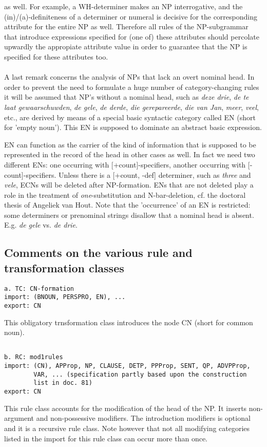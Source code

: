 as well. For example, a WH-determiner makes an NP interrogative, and the
(in)/(a)-definiteness of a determiner or numeral is decisive for the
corresponding attribute for the entire NP as well. Therefore all rules of the
NP-subgrammar that introduce expressions specified for (one of) these
attributes should percolate upwardly the appropiate attribute value in order to
guarantee that the NP is specified for these attributes too.\\ \\ 
A last remark concerns the analysis of NPs that lack an overt nominal head. In
order to prevent the need to formulate a huge number of category-changing rules
it will be assumed that NP's without a nominal head, such as 
{\em deze drie}, {\em de
te laat gewaarschuwden}, {\em de gele}, {\em de derde}, 
{\em die gerepareerde}, {\em die van
Jan}, {\em meer}, {\em veel}, etc., are derived by means of a special basic syntactic
category called EN (short for 'empty noun'). 
This EN is supposed to dominate an abstract
basic expression. 

EN can function as the carrier of the kind of information that is supposed to
be represented in the record of the head in other cases as well. In fact we
need two different ENs: one occurring with [+count]-specifiers, another
occurring with [-count]-specifiers. Unless there is a [+count, -def]
determiner, such as {\em three} and {\em vele}, ECNs  will be deleted after
NP-formation. ENs that are not deleted play a role in the treatment of
{\em one}-substitution and N-bar-deletion, cf. the doctoral thesis of Angeliek van
Hout. Note that the 'occurrence' of an EN is restricted: some determiners or
prenominal strings disallow that a nominal head is absent. E.g. {\em de gele}
vs. {\em *de drie}.

\subsection{Comments on the various rule and transformation classes}
\begin{verbatim}
a. TC: CN-formation
import: (BNOUN, PERSPRO, EN), ...
export: CN
\end{verbatim}
This obligatory trnsformation 
class introduces the node CN (short for common noun).
\begin{verbatim}

b. RC: mod1rules
import: (CN), APProp, NP, CLAUSE, DETP, PPProp, SENT, QP, ADVPProp, 
        VAR, ... (specification partly based upon the construction 
        list in doc. 81)
export: CN
\end{verbatim}
This rule class accounts for the modification of the head of the NP. It inserts
non-argument and non-possessive modifiers. The introduction modifiers is
optional and it is a recursive rule class. Note however that not all modifying
categories listed in the import for this rule class can occur more than once. 

